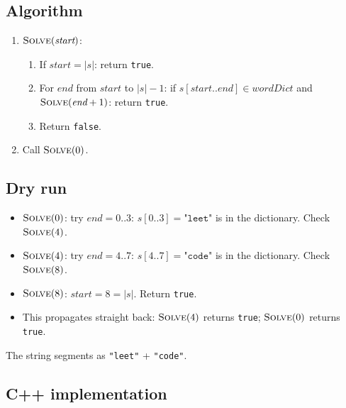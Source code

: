 \subsection*{Algorithm}

\begin{enumerate}
  \item $\textsc{Solve}(\textit{start})$:
  \begin{enumerate}
    \item If $\textit{start}=|s|$: return \texttt{true}.
    \item For $\textit{end}$ from $\textit{start}$ to $|s|-1$: if
          $s[\textit{start}..\textit{end}] \in \textit{wordDict}$ and
          $\textsc{Solve}(\textit{end}+1)$: return \texttt{true}.
    \item Return \texttt{false}.
  \end{enumerate}
  \item Call $\textsc{Solve}(0)$.
\end{enumerate}

\subsection*{Dry run}


\begin{itemize}
  \item $\textsc{Solve}(0)$: try $\textit{end}=0..3$:
        $s[0..3]=\texttt{"leet"}$ is in the dictionary. Check
        $\textsc{Solve}(4)$.
  \item $\textsc{Solve}(4)$: try $\textit{end}=4..7$:
        $s[4..7]=\texttt{"code"}$ is in the dictionary. Check
        $\textsc{Solve}(8)$.
  \item $\textsc{Solve}(8)$: $\textit{start}=8=|s|$. Return
        \texttt{true}.
  \item This propagates straight back: $\textsc{Solve}(4)$ returns
        \texttt{true}; $\textsc{Solve}(0)$ returns \texttt{true}.
\end{itemize}

The string segments as \texttt{"leet"} + \texttt{"code"}.

\subsection*{C++ implementation}

